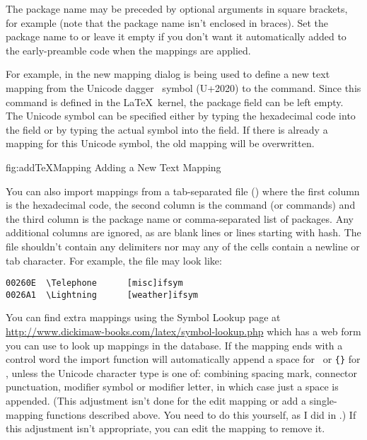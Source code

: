 The package name may be preceded by optional arguments in square
brackets, for example  (note that the package name
isn't enclosed in braces). Set the package name to  or
leave it empty if you don't want it automatically added to the early-preamble
code when the mappings are applied.

For example, in  the new mapping dialog
is being used to define a new text mapping from the Unicode dagger
\textdagger\ symbol (U+2020) to the  command.
Since this command is defined in the \LaTeX\ kernel, the package
field can be left empty. The Unicode symbol can be specified either
by typing the hexadecimal code into the
 field or by typing the actual
symbol into the  field. If there
is already a mapping for this Unicode symbol, the old mapping will
be overwritten.

\FloatFig
  {fig:addTeXMapping}
  {}
  {Adding a New Text Mapping} 

You can also import mappings from a tab-separated file ()
where the first column is the hexadecimal code, the second column is
the command (or commands) and the third column is the package name
or comma-separated list of packages. Any additional columns are
ignored, as are blank lines or lines starting with \gls{hash}. The file
shouldn't contain any delimiters nor may any of
the cells contain a newline or tab character. For example,
the file may look like:
\begin{verbatim}
00260E  \Telephone      [misc]ifsym
0026A1  \Lightning      [weather]ifsym
\end{verbatim}

You can find extra mappings using the Symbol Lookup page at
\url{http://www.dickimaw-books.com/latex/symbol-lookup.php} which
has a web form you can use to look up mappings in the database.  If
the mapping ends with a control word the import function will
automatically append a space for \mathsmode\ or
\verb|{}| for \textmode, unless the Unicode character type is one
of: combining spacing mark, connector punctuation, modifier symbol
or modifier letter, in which case just a space is appended.
(This adjustment isn't done for the edit mapping or
add a single-mapping functions described above. You need to do this
yourself, as I did in .) If this
adjustment isn't appropriate, you can edit the mapping to remove it.

